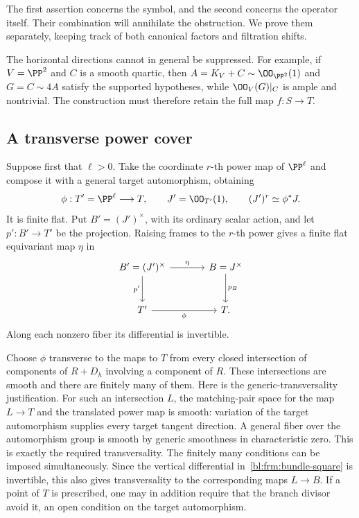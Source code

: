 The first assertion concerns the symbol, and the second concerns the
operator itself. Their combination will annihilate the obstruction.
We prove them separately, keeping track of both canonical factors
and filtration shifts.

The horizontal directions cannot in general be suppressed. For
example, if $V=\PP^2$ and $C$ is a smooth quartic, then
$A=K_V+C\sim\OO_{\PP^2}(1)$ and $G=C\sim4A$ satisfy the
supported hypotheses, while $\OO_V(G)|_C$ is ample and nontrivial.
The construction must therefore retain the full map $f:S\to T$.

\subsection{A transverse power cover}

Suppose first that $\ell>0$. Take the coordinate $r$-th power map of
$\PP^\ell$ and compose it with a general target automorphism, obtaining
\[
 \phi:T'=\PP^\ell\longrightarrow T,
 \qquad J'=\OO_{T'}(1),\qquad (J')^r\simeq\phi^*J.
\]
It is finite flat. Put $B'=(J')^\times$, with its ordinary scalar
action, and let $p':B'\to T'$ be the projection. Raising frames to
the $r$-th power gives a finite flat equivariant map $\eta$ in
\begin{equation}\label{bl:frm:bundle-square}
\begin{tikzcd}[column sep=large,row sep=large]
B'=(J')^\times \arrow[r,"\eta"] \arrow[d,"p'"'] &
B=J^\times \arrow[d,"p_B"]\\
T' \arrow[r,"\phi"'] & T.
\end{tikzcd}
\end{equation}
Along each nonzero fiber its differential is invertible.

Choose $\phi$ transverse to the maps to $T$ from every closed
intersection of components of $R+D_h$ involving a component of $R$.
These intersections are smooth and there are finitely many of them.
Here is the generic-transversality justification. For such an
intersection $L$, the matching-pair space for the map $L\to T$
and the translated power map is smooth: variation of the target
automorphism supplies every target tangent direction. A general
fiber over the automorphism group is smooth by generic smoothness
in characteristic zero. This is exactly the required transversality.
The finitely many conditions can be imposed simultaneously.
Since the vertical differential in~\eqref{bl:frm:bundle-square} is
invertible, this also gives transversality to the corresponding
maps $L\to B$. If a point of $T$ is prescribed, one may in addition
require that the branch divisor avoid it, an open condition on
the target automorphism.

